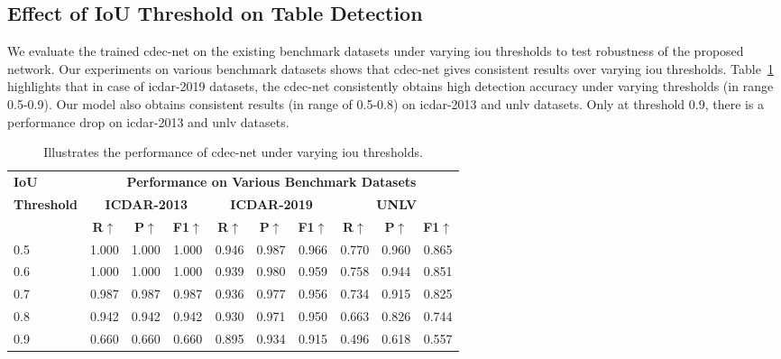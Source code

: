 \documentclass[a4paper,conference]{IEEEtran}
\begin{document}
\subsection{Effect of IoU Threshold on Table Detection}

We evaluate the trained {\sc cd}e{\sc c-n}et on the existing benchmark datasets under varying {\sc i}o{\sc u} thresholds to test robustness of the proposed network. Our experiments on various benchmark datasets shows that {\sc cd}e{\sc c-n}et gives consistent results over varying {\sc i}o{\sc u} thresholds. Table~\ref{table_iou_threshold} highlights that in case of {\sc icdar-2019} datasets, the {\sc cd}e{\sc c-n}et consistently obtains high detection accuracy under varying thresholds (in range 0.5-0.9). Our model also obtains consistent results (in range of 0.5-0.8) on {\sc icdar-2013} and {\sc unlv} datasets. Only at threshold 0.9, there is a performance drop on {\sc icdar-2013} and {\sc unlv} datasets. 



\begin{table}[ht!]
\addtolength{\tabcolsep}{-3.5pt}
\begin{center}
\begin{tabular}{|l|c c c|c c c|c c c|} \hline
\textbf{IoU} &\multicolumn{9}{c|}{\textbf{Performance on Various Benchmark Datasets}} \\ \cline{2-10}
\textbf{Threshold}  &\multicolumn{3}{c|}{\textbf{ICDAR-2013}} &\multicolumn{3}{c|}{\textbf{ICDAR-2019}}  &\multicolumn{3}{c|}{\textbf{UNLV}}  \\ \cline{2-10}   
 &\textbf{R}$\uparrow$ &\textbf{P}$\uparrow$ &\textbf{F1}$\uparrow$ &\textbf{R}$\uparrow$ &\textbf{P}$\uparrow$ &\textbf{F1}$\uparrow$ &\textbf{R}$\uparrow$ &\textbf{P}$\uparrow$ &\textbf{F1}$\uparrow$ \\ \hline
0.5 &1.000 &1.000 &1.000 &0.946 &0.987 &0.966 &0.770 &0.960 &0.865 \\
0.6 &1.000 &1.000 &1.000 &0.939 &0.980 &0.959 &0.758 &0.944 &0.851 \\ 
0.7 &0.987 &0.987 &0.987 &0.936 &0.977 &0.956 &0.734 &0.915 &0.825 \\
0.8 &0.942 &0.942 &0.942 &0.930 &0.971 &0.950 &0.663 &0.826 &0.744 \\
0.9 &0.660 &0.660 &0.660 &0.895 &0.934 &0.915 &0.496 &0.618 &0.557 \\ \hline
\end{tabular}
\end{center}
\caption{Illustrates the performance of {\sc cd}e{\sc c-n}et under varying {\sc i}o{\sc u} thresholds. \label{table_iou_threshold}}
\end{table}
\end{document}

